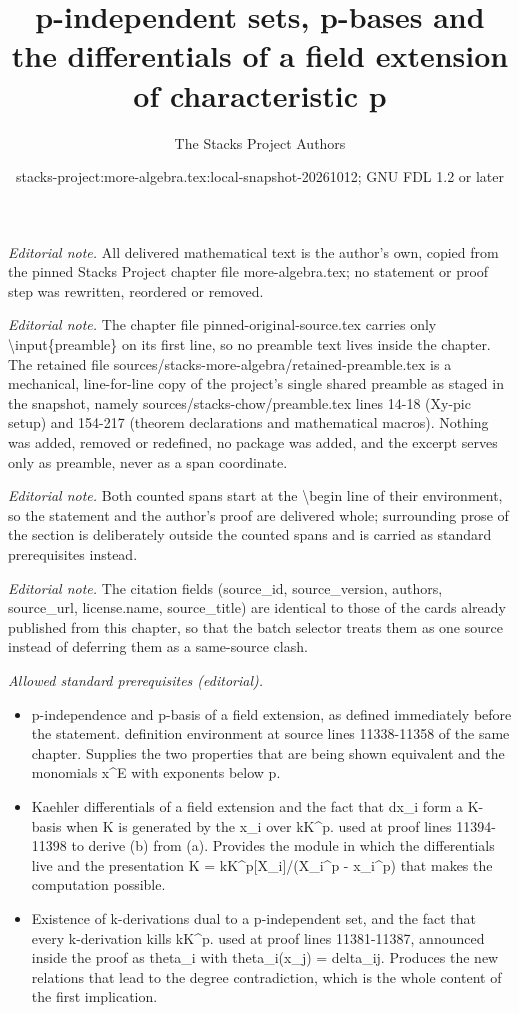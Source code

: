 \documentclass[10pt,a4paper]{amsart}
\title{p-independent sets, p-bases and the differentials of a field extension of characteristic p}
\author{The Stacks Project Authors}
\date{stacks-project:more-algebra.tex:local-snapshot-20261012; GNU FDL 1.2 or later}
\theoremstyle{plain}
\theoremstyle{definition}
\theoremstyle{remark}
\numberwithin{equation}{subsection}
\begin{document}
\maketitle
\setcounter{subsection}{1}
\noindent\textit{Editorial note.} All delivered mathematical text is the author's own, copied from the pinned Stacks Project chapter file more-algebra.tex; no statement or proof step was rewritten, reordered or removed.\par\medskip
\noindent\textit{Editorial note.} The chapter file pinned-original-source.tex carries only \textbackslash{}input\{preamble\} on its first line, so no preamble text lives inside the chapter. The retained file sources/stacks-more-algebra/retained-preamble.tex is a mechanical, line-for-line copy of the project's single shared preamble as staged in the snapshot, namely sources/stacks-chow/preamble.tex lines 14-18 (Xy-pic setup) and 154-217 (theorem declarations and mathematical macros). Nothing was added, removed or redefined, no package was added, and the excerpt serves only as preamble, never as a span coordinate.\par\medskip
\noindent\textit{Editorial note.} Both counted spans start at the \textbackslash{}begin line of their environment, so the statement and the author's proof are delivered whole; surrounding prose of the section is deliberately outside the counted spans and is carried as standard prerequisites instead.\par\medskip
\noindent\textit{Editorial note.} The citation fields (source\_id, source\_version, authors, source\_url, license.name, source\_title) are identical to those of the cards already published from this chapter, so that the batch selector treats them as one source instead of deferring them as a same-source clash.\par\medskip
\noindent\textit{Allowed standard prerequisites (editorial).}\begin{itemize}
\item p-independence and p-basis of a field extension, as defined immediately before the statement. definition environment at source lines 11338-11358 of the same chapter. Supplies the two properties that are being shown equivalent and the monomials x\textasciicircum{}E with exponents below p.
\item Kaehler differentials of a field extension and the fact that dx\_i form a K-basis when K is generated by the x\_i over kK\textasciicircum{}p. used at proof lines 11394-11398 to derive (b) from (a). Provides the module in which the differentials live and the presentation K = kK\textasciicircum{}p[X\_i]/(X\_i\textasciicircum{}p - x\_i\textasciicircum{}p) that makes the computation possible.
\item Existence of k-derivations dual to a p-independent set, and the fact that every k-derivation kills kK\textasciicircum{}p. used at proof lines 11381-11387, announced inside the proof as theta\_i with theta\_i(x\_j) = delta\_ij. Produces the new relations that lead to the degree contradiction, which is the whole content of the first implication.
\end{itemize}\medskip
\end{document}
